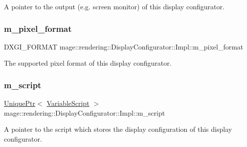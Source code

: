 A pointer to the output (e.\+g. screen monitor) of this display configurator. \hypertarget{classmage_1_1rendering_1_1_display_configurator_1_1_impl_a87d52e7bc1a1e4fe9786b3b0ec3fc1e1}{}\label{classmage_1_1rendering_1_1_display_configurator_1_1_impl_a87d52e7bc1a1e4fe9786b3b0ec3fc1e1} 
\subsubsection{\texorpdfstring{m\+\_\+pixel\+\_\+format}{m\_pixel\_format}}
{\footnotesize\ttfamily D\+X\+G\+I\+\_\+\+F\+O\+R\+M\+AT mage\+::rendering\+::\+Display\+Configurator\+::\+Impl\+::m\+\_\+pixel\+\_\+format\hspace{0.3cm}{\ttfamily [private]}}

The supported pixel format of this display configurator. \hypertarget{classmage_1_1rendering_1_1_display_configurator_1_1_impl_aa11b99f1bdf03e3d1eee4d4907479c45}{}\label{classmage_1_1rendering_1_1_display_configurator_1_1_impl_aa11b99f1bdf03e3d1eee4d4907479c45} 
\subsubsection{\texorpdfstring{m\+\_\+script}{m\_script}}
{\footnotesize\ttfamily \hyperlink{namespacemage_a3316d7143a973e37adf1110f2e80ca31}{Unique\+Ptr}$<$ \hyperlink{classmage_1_1_variable_script}{Variable\+Script} $>$ mage\+::rendering\+::\+Display\+Configurator\+::\+Impl\+::m\+\_\+script\hspace{0.3cm}{\ttfamily [private]}}

A pointer to the script which stores the display configuration of this display configurator. \hypertarget{classmage_1_1rendering_1_1_display_configurator_1_1_impl_ad0276623b8642595132fb873d06bfd61}{}\label{classmage_1_1rendering_1_1_display_configurator_1_1_impl_ad0276623b8642595132fb873d06bfd61} 
